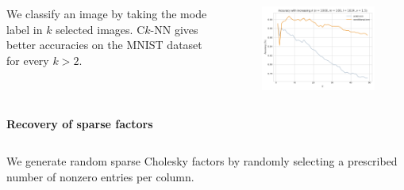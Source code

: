 \documentclass{beamer}                             %
\newcommand{\blocktitle}[1]{{\Large \textbf{#1}}}
\begin{document}
\begin{frame}[t]
\begin{columns}[T]
\begin{column}{0.30\textwidth}
\begin{tcolorbox}
    \begin{columns}
      \begin{column}{0.5\textwidth}
        We classify an image by taking the mode label in \( k \)
        selected images. C\( k \)-NN gives better accuracies
        on the MNIST dataset for every \( k > 2 \).
      \end{column}
      \begin{column}{0.5\textwidth}
        \begin{figure}[h!]
          \centering
          \includegraphics[width=\textwidth]{data/k_acc}
        \end{figure}
      \end{column}
    \end{columns}
  \end{tcolorbox}

  \begin{tcolorbox}
    \blocktitle{Recovery of sparse factors}

    \begin{columns}
      \begin{column}{0.5\textwidth}
        We generate random sparse Cholesky factors by randomly
        selecting a prescribed number of nonzero entries per column.


\end{column}
\end{columns}
\end{tcolorbox}
\end{column}
\end{columns}
\end{frame}
\end{document}
